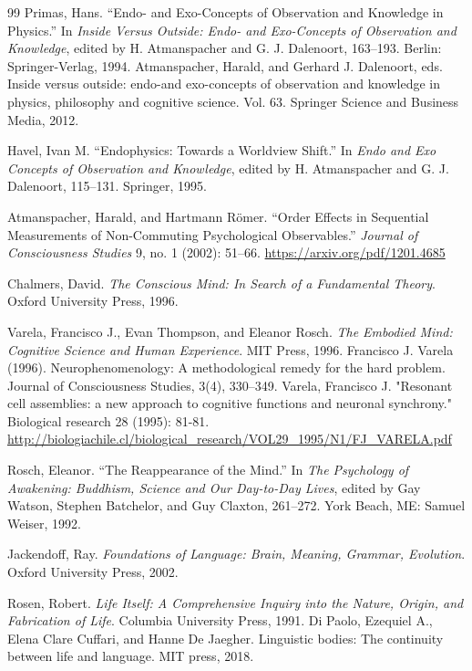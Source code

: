 \documentclass[11pt]{article}
\numberwithin{equation}{section} %
\begin{document}
\begin{thebibliography}{99}
Primas, Hans. “Endo- and Exo-Concepts of Observation and Knowledge in Physics.” In \textit{Inside Versus Outside: Endo- and Exo-Concepts of Observation and Knowledge}, edited by H. Atmanspacher and G. J. Dalenoort, 163–193. Berlin: Springer-Verlag, 1994. Atmanspacher, Harald, and Gerhard J. Dalenoort, eds. Inside versus outside: endo-and exo-concepts of observation and knowledge in physics, philosophy and cognitive science. Vol. 63. Springer Science and Business Media, 2012.

Havel, Ivan M. “Endophysics: Towards a Worldview Shift.” In \textit{Endo and Exo Concepts of Observation and Knowledge}, edited by H. Atmanspacher and G. J. Dalenoort, 115–131. Springer, 1995.

Atmanspacher, Harald, and Hartmann Römer. “Order Effects in Sequential Measurements of Non-Commuting Psychological Observables.” \textit{Journal of Consciousness Studies} 9, no. 1 (2002): 51–66. \url{https://arxiv.org/pdf/1201.4685}

Chalmers, David. \textit{The Conscious Mind: In Search of a Fundamental Theory}. Oxford University Press, 1996.

Varela, Francisco J., Evan Thompson, and Eleanor Rosch. \textit{The Embodied Mind: Cognitive Science and Human Experience}. MIT Press, 1996. Francisco J. Varela (1996). Neurophenomenology: A methodological remedy for the hard problem. Journal of Consciousness Studies, 3(4), 330–349. Varela, Francisco J. "Resonant cell assemblies: a new approach to cognitive functions and neuronal synchrony." Biological research 28 (1995): 81-81. \url{http://biologiachile.cl/biological_research/VOL29_1995/N1/FJ_VARELA.pdf}

Rosch, Eleanor. “The Reappearance of the Mind.” In \textit{The Psychology of Awakening: Buddhism, Science and Our Day-to-Day Lives}, edited by Gay Watson, Stephen Batchelor, and Guy Claxton, 261–272. York Beach, ME: Samuel Weiser, 1992.

Jackendoff, Ray. \textit{Foundations of Language: Brain, Meaning, Grammar, Evolution}. Oxford University Press, 2002.

Rosen, Robert. \textit{Life Itself: A Comprehensive Inquiry into the Nature, Origin, and Fabrication of Life}. Columbia University Press, 1991. Di Paolo, Ezequiel A., Elena Clare Cuffari, and Hanne De Jaegher. Linguistic bodies: The continuity between life and language. MIT press, 2018.


\end{thebibliography}
\end{document}
